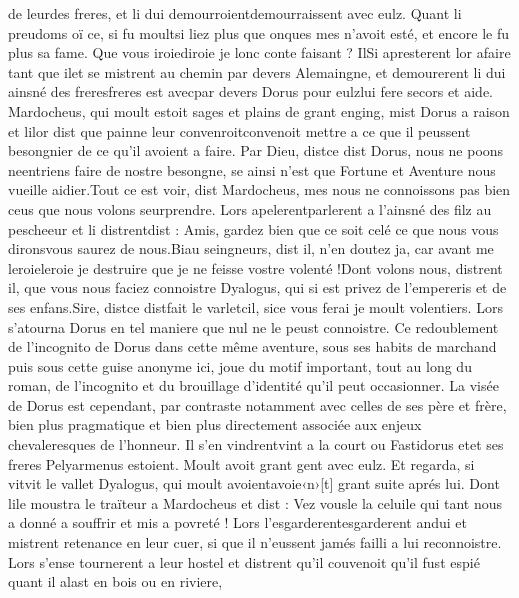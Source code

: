 \documentclass{article}
\begin{document}
\begin{pages}
   de leurdes freres, et li dui 
   demourroientdemourraissent avec eulz. 
   Quant li preudoms oï ce, 
   si fu moultsi liez 
   plus que onques mes n’avoit esté, 
   et encore le fu plus sa fame. 
   Que vous iroiediroie je 
      lonc conte faisant ?
   IlSi apresterent lor afaire 
   tant que ilet 
   se mistrent au chemin par devers Alemaingne, et demourerent li dui ainsné des 
   freresfreres est 
   avecpar devers Dorus pour 
   eulzlui fere secors et aide. 
   Mardocheus, qui moult estoit sages et plains de grant enging, mist 
   Dorus a raison et lilor dist que 
   painne leur convenroitconvenoit mettre 
      a ce que il peussent besongnier de ce qu’il avoient a faire.
   Par Dieu, distce dist 
      Dorus, nous ne poons neentriens 
      faire de nostre besongne, se ainsi n’est que Fortune et Aventure nous vueille aidier.Tout ce est voir, dist Mardocheus, mes nous ne connoissons pas 
   bien ceus que nous volons seurprendre.
   Lors apelerentparlerent a 
   l’ainsné des filz au 
      pescheeur et li distrentdist :
   Amis, gardez bien que ce soit celé ce que 
      nous vous dironsvous saurez de nous.Biau seingneurs, dist il, n’en doutez ja, 
      car avant me leroieleroie je destruire que je ne feisse vostre volenté !Dont volons nous, distrent il, 
      que vous nous faciez connoistre Dyalogus, 
   qui si est privez de l’empereris et de ses enfans.Sire, distce distfait 
      le varletcil, 
      sice vous ferai je moult volentiers. \pend
\pstart Lors s’atourna Dorus en tel maniere que nul ne le peust connoistre.
   Ce redoublement de l'incognito de Dorus dans cette même aventure, 
      sous ses habits de marchand puis sous cette guise anonyme ici, joue du motif important, tout au long du roman, 
      de l'incognito et du brouillage d'identité qu'il peut occasionner. 
      La visée de Dorus est cependant, par contraste notamment avec celles de ses père et frère, bien plus pragmatique
      et bien plus directement associée aux enjeux chevaleresques de l'honneur.
   Il s’en vindrentvint a la court ou Fastidorus 
   etet ses freres Pelyarmenus 
   estoient. Moult avoit grant gent avec eulz. Et regarda, si vitvit le vallet 
   Dyalogus, 
   qui moult avoientavoie‹n›[t] grant suite aprés lui. 
   Dont lile moustra 
   le traïteur a 
   Mardocheus et dist :
   Vez vousle la 
      celuile qui tant nous a donné a souffrir et mis a povreté !
   Lors l'esgarderentesgarderent andui et mistrent retenance 
   en leur cuer, 
   si que il n’eussent jamés failli a lui reconnoistre. 
   Lors s’ense tournerent a leur hostel et distrent 
   qu’il couvenoit qu’il fust espié quant il alast en bois ou en riviere, 

\end{pages}
\end{document}

